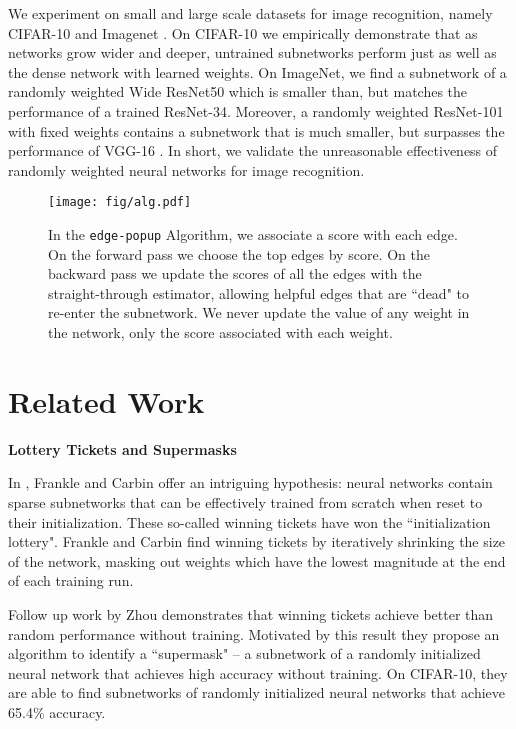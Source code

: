 \documentclass[10pt,twocolumn,letterpaper]{article}
\newcommand{\alg}{\texttt{edge-popup} }
\begin{document}
We experiment on small and large scale datasets for image recognition, namely CIFAR-10 \cite{cifar} and Imagenet \cite{imagenet}. On CIFAR-10 we empirically demonstrate that as networks grow wider and deeper, untrained subnetworks perform just as well as the dense network with learned weights. On ImageNet, we find a subnetwork of a randomly weighted Wide ResNet50 which is smaller than, but matches the performance of a trained ResNet-34. Moreover, a randomly weighted ResNet-101 \cite{resnet} with fixed weights contains a subnetwork that is much smaller, but surpasses the performance of VGG-16 \cite{vgg}. In short, we validate the unreasonable effectiveness of randomly weighted neural networks for image recognition.


\begin{figure*}[t!]
    \centering
    \texttt{[image: fig/alg.pdf]}
    \caption{In the \alg Algorithm, we associate a score with each edge. On the forward pass we choose the top edges by score. On the backward pass we update the scores of all the edges with the straight-through estimator, allowing helpful edges that are ``dead" to re-enter the subnetwork. We never update the value of any weight in the network, only the score associated with each weight.}
    \label{fig:alg}
\end{figure*}

\section{Related Work}

\noindent\textbf{Lottery Tickets and Supermasks}

In \cite{lth}, Frankle and Carbin offer an intriguing hypothesis: neural networks contain sparse subnetworks that can be effectively trained from scratch when reset to their initialization. These so-called winning tickets have won the ``initialization lottery". Frankle and Carbin find winning tickets by iteratively shrinking the size of the network, masking out weights which have the lowest magnitude at the end of each training run.

Follow up work by Zhou \etal \cite{supermask} demonstrates that winning tickets achieve better than random performance without training. Motivated by this result they propose an algorithm to identify a ``supermask" -- a subnetwork of a randomly initialized neural network that achieves high accuracy without training. On CIFAR-10, they are able to find subnetworks of randomly initialized neural networks that achieve 65.4\% accuracy.
\end{document}
